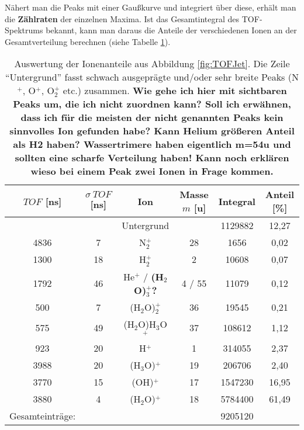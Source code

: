 Nähert man die Peaks mit einer Gaußkurve und integriert über diese, erhält man die \textbf{Zählraten} der einzelnen Maxima. Ist das Gesamtintegral des TOF-Spektrums bekannt, kann man daraus die Anteile der verschiedenen Ionen an der Gesamtverteilung berechnen (siehe Tabelle \ref{tab:Antile}).
%
\begin{center}
\begin{table}
\begin{tabular}{c c c c c c} \toprule
		 $TOF$ [ns] & $\sigma \ TOF$ [ns] & Ion & Masse $m$ [u] & Integral & Anteil [\%]\\\midrule
            &   & Untergrund & & 1129882 & 12,27\\
       4836 & 7  & N$_2^+$ & 28 & 1656 & 0,02 \\
       1300 & 18 & H$_2^+$ & 2 & 10608 & 0,07 \\
       1792 & 46 & He$^+$ / \textbf{(H$_2$O)$_3^+$?} & 4 / 55 & 11079 & 0,12 \\
       500 & 7 & (H$_2$O)$_2^+$ & 36 & 19545 & 0,21 \\
       575 & 49 & (H$_2$O)H$_3$O$^+$ & 37 & 108612 & 1,12 \\
       923 & 20 & H$^+$ & 1 & 314055 & 2,37 \\
       3988 & 20 & (H$_3$O)$^+$ & 19 & 206706 & 2,40 \\
       3770 & 15 & (OH)$^+$ & 17 & 1547230 & 16,95 \\
       3880 & 4 & (H$_2$O)$^+$ & 18 & 5784400 & 61,49 \\\bottomrule  
	  Gesamteinträge: & &&& 9205120 \\\bottomrule
	  
\end{tabular}
 \caption{Auswertung der Ionenanteile aus Abbildung \ref{fig:TOFJet}. Die Zeile \enquote{Untergrund} fasst schwach ausgeprägte und/oder sehr breite Peaks (N$^+$, O$^+$, O$_2^+$ etc.) zusammen. \textbf{Wie gehe ich hier mit sichtbaren Peaks um, die ich nicht zuordnen kann? Soll ich erwähnen, dass ich für die meisten der nicht genannten Peaks kein sinnvolles Ion gefunden habe? Kann Helium größeren Anteil als H2 haben? Wassertrimere haben eigentlich m=54u und sollten eine scharfe Verteilung haben! Kann noch erklären wieso bei einem Peak zwei Ionen in Frage kommen.}} \label{tab:Antile}
\end{table}
\end{center} 


